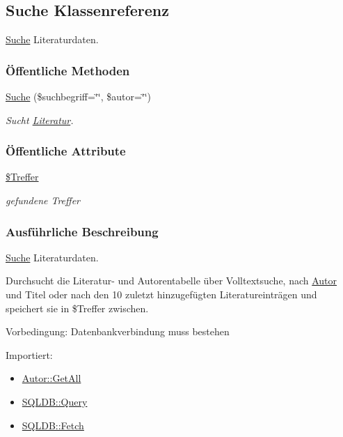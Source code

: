 \hypertarget{classSuche}{
\subsection{Suche Klassenreferenz}
\label{classSuche}
}
\hyperlink{classSuche}{Suche} Literaturdaten.  


\subsubsection*{\"{O}ffentliche Methoden}
\begin{CompactItemize}
\item 
\hyperlink{classSuche_277cd59d3689d6f0875d114be0024935}{Suche} (\$suchbegriff=\char`\"{}\char`\"{}, \$autor=\char`\"{}\char`\"{})
\begin{CompactList}\small\item\em Sucht \hyperlink{classLiteratur}{Literatur}. \item\end{CompactList}\end{CompactItemize}
\subsubsection*{\"{O}ffentliche Attribute}
\begin{CompactItemize}
\item 
\hyperlink{classSuche_0ee0e1ffb3f79392915fd39934d7140d}{\$Treffer}
\begin{CompactList}\small\item\em gefundene Treffer \item\end{CompactList}\end{CompactItemize}


\subsubsection{Ausf\"{u}hrliche Beschreibung}
\hyperlink{classSuche}{Suche} Literaturdaten. 

Durchsucht die Literatur- und Autorentabelle über Volltextsuche, nach \hyperlink{classAutor}{Autor} und Titel oder nach den 10 zuletzt hinzugefügten Literatureinträgen und speichert sie in \$Treffer zwischen. \begin{Desc}
\item[Vorbedingung:]Datenbankverbindung muss bestehen \end{Desc}
\begin{Desc}
\item[Importiert:]\begin{itemize}
\item \hyperlink{classAutor_79cd90084cab240919a5daecf39156a7}{Autor::Get\-All}\item \hyperlink{classSQLDB_fc6ffa8df50f68f07d9f5e3385b96d7a}{SQLDB::Query}\item \hyperlink{classSQLDB_a55c00ce1de0e50e0a58cae61892ba35}{SQLDB::Fetch} \end{itemize}
\end{Desc}




